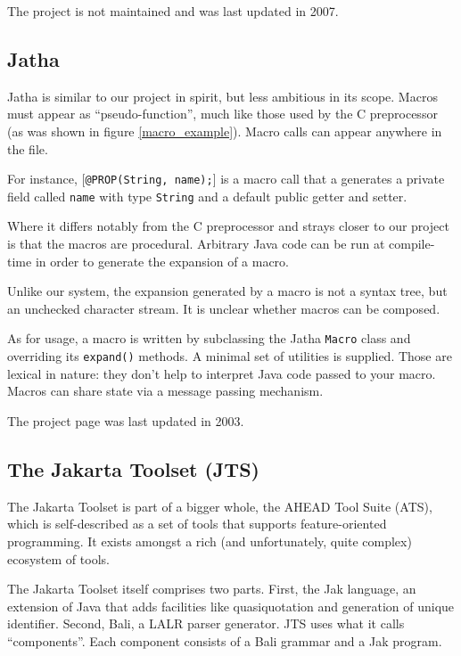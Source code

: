 The project is not maintained and was last updated in 2007.

\subsection{Jatha}

Jatha is similar to our project in spirit, but less ambitious in its
scope. Macros must appear as ``pseudo-function'', much like those used by the C
preprocessor (as was shown in figure \ref{macro_example}). Macro calls can
appear anywhere in the file.

For instance, [\texttt{@PROP(String, name);}] is a macro call that a generates a
private field called \texttt{name} with type \texttt{String} and a default
public getter and setter.

Where it differs notably from the C preprocessor and strays closer to our
project is that the macros are procedural. Arbitrary Java code can be run at
compile-time in order to generate the expansion of a macro.

Unlike our system, the expansion generated by a macro is not a syntax tree, but
an unchecked character stream. It is unclear whether macros can be composed.

As for usage, a macro is written by subclassing the Jatha \texttt{Macro} class
and overriding its \texttt{expand()} methods. A minimal set of utilities is
supplied. Those are lexical in nature: they don't help to interpret Java code
passed to your macro. Macros can share state via a message passing mechanism.

The project page \cite{jatha} was last updated in 2003.

\subsection{The Jakarta Toolset (JTS)}

The Jakarta Toolset is part of a bigger whole, the AHEAD Tool Suite (ATS), which
is self-described as a set of tools that supports feature-oriented
programming. It exists amongst a rich (and unfortunately, quite complex)
ecosystem of tools.

The Jakarta Toolset itself comprises two parts. First, the Jak language, an
extension of Java that adds facilities like quasiquotation and generation of
unique identifier. Second, Bali, a LALR parser generator. JTS uses what it calls
``components''. Each component consists of a Bali grammar and a Jak
program.

